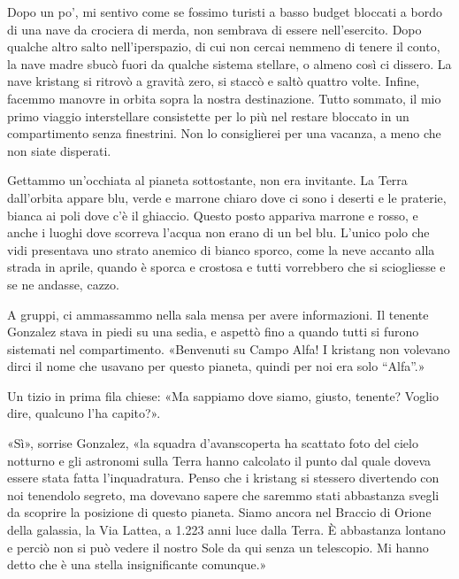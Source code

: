 Dopo un po', mi sentivo come se fossimo turisti a basso budget bloccati
a bordo di una nave da crociera di merda, non sembrava di essere
nell'esercito. Dopo qualche altro salto nell'iperspazio, di cui non
cercai nemmeno di tenere il conto, la nave madre sbucò fuori da qualche
sistema stellare, o almeno così ci dissero. La nave kristang si ritrovò
a gravità zero, si staccò e saltò quattro volte. Infine, facemmo manovre
in orbita sopra la nostra destinazione. Tutto sommato, il mio primo
viaggio interstellare consistette per lo più nel restare bloccato in un
compartimento senza finestrini. Non lo consiglierei per una vacanza, a
meno che non siate disperati.

Gettammo un'occhiata al pianeta sottostante, non era invitante. La Terra
dall'orbita appare blu, verde e marrone chiaro dove ci sono i deserti e
le praterie, bianca ai poli dove c'è il ghiaccio. Questo posto appariva
marrone e rosso, e anche i luoghi dove scorreva l'acqua non erano di un
bel blu. L'unico polo che vidi presentava uno strato anemico di bianco
sporco, come la neve accanto alla strada in aprile, quando è sporca e
crostosa e tutti vorrebbero che si sciogliesse e se ne andasse, cazzo.

A gruppi, ci ammassammo nella sala mensa per avere informazioni. Il
tenente Gonzalez stava in piedi su una sedia, e aspettò fino a quando
tutti si furono sistemati nel compartimento. «Benvenuti su Campo Alfa! I
kristang non volevano dirci il nome che usavano per questo pianeta,
quindi per noi era solo ``Alfa''.»

Un tizio in prima fila chiese: «Ma sappiamo dove siamo, giusto, tenente?
Voglio dire, qualcuno l'ha capito?».

«Sì», sorrise Gonzalez, «la squadra d'avanscoperta ha scattato foto del
cielo notturno e gli astronomi sulla Terra hanno calcolato il punto dal
quale doveva essere stata fatta l'inquadratura. Penso che i kristang si
stessero divertendo con noi tenendolo segreto, ma dovevano sapere che
saremmo stati abbastanza svegli da scoprire la posizione di questo
pianeta. Siamo ancora nel Braccio di Orione della galassia, la Via
Lattea, a 1.223 anni luce dalla Terra. È abbastanza lontano e perciò non
si può vedere il nostro Sole da qui senza un telescopio. Mi hanno detto
che è una stella insignificante comunque.»

